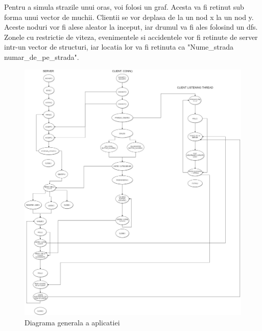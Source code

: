 \documentclass[runningheads]{llncs}
\begin{document}
Pentru a simula strazile unui oras, voi folosi un graf. Acesta va fi retinut sub forma unui vector de muchii. Clientii se vor deplasa de la un nod x la un nod y. Aceste noduri vor fi alese aleator la inceput, iar drumul va fi ales folosind un dfs. Zonele cu restrictie de viteza, evenimentele si accidentele vor fi retinute de server intr-un vector de structuri, iar locatia lor va fi retinuta ca "Nume\_strada numar\_de\_pe\_strada".


\begin{figure}[H]
\includegraphics[width=\textwidth]{APPLICATION.jpg}
\caption{Diagrama generala a aplicatiei}
\end{figure}
\end{document}

